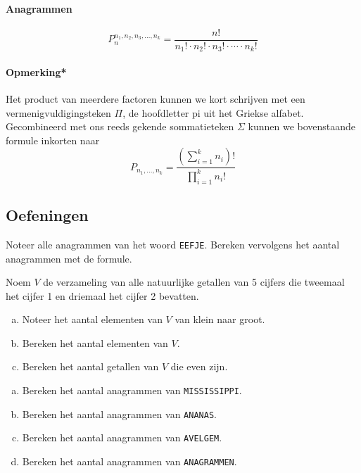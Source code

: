 \documentclass[12pt,a4paper,twoside]{article}
\begin{document}
\paragraph*{Anagrammen}
\begin{mdframed}
$$P^{n_1,n_2,n_3,\dots,n_k}_n = \dfrac{n!}{n_1!\cdot n_2!\cdot n_3!\cdot \cdots \cdot n_k!}$$
\end{mdframed}

\paragraph*{Opmerking*}
Het product van meerdere factoren kunnen we kort schrijven met een vermenigvuldigingsteken $\Pi$, de hoofdletter pi uit het Griekse alfabet. Gecombineerd met ons reeds gekende sommatieteken $\Sigma$ kunnen we bovenstaande formule inkorten naar
\[P_{n_1,\dots,n_k} = \dfrac{\left(\sum_{i=1}^k n_i\right)!}{\prod_{i=1}^k n_i!}\]

\subsection{Oefeningen}

\vspace*{-0.5cm}
\begin{oefening}
Noteer alle anagrammen van het woord \texttt{EEFJE}. Bereken vervolgens het aantal anagrammen met de formule.
\end{oefening}

\begin{oefening}
Noem $V$ de verzameling van alle natuurlijke getallen van 5 cijfers die tweemaal het cijfer 1 en driemaal het cijfer 2 bevatten.
\begin{enumerate}[(a)]
  \item Noteer het aantal elementen van $V$ van klein naar groot.
  \item Bereken het aantal elementen van $V$.
  \item Bereken het aantal getallen van $V$ die even zijn.
\end{enumerate}
\end{oefening}

\begin{oefening}
  \begin{enumerate}[(a)]
  \item Bereken het aantal anagrammen van \texttt{MISSISSIPPI}.
  \item Bereken het aantal anagrammen van \texttt{ANANAS}.
  \item Bereken het aantal anagrammen van \texttt{AVELGEM}.
  \item Bereken het aantal anagrammen van \texttt{ANAGRAMMEN}.
  \end{enumerate}
\end{oefening}
\end{document}
